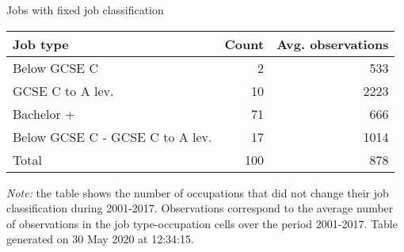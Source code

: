 \begin{center}
\begin{threeparttable}[!h]
\caption{Jobs with fixed job classification}
\begin{tabular}{lrr}
\toprule
\toprule
\textbf{Job type}&\multicolumn{1}{c}{\textbf{Count}}&\multicolumn{1}{c}{\textbf{Avg. observations}} \\
\midrule
\hline
Below GCSE C&2&533 \\
GCSE C to A lev.&10&2223 \\
Bachelor +&71&666 \\
Below GCSE C - GCSE C to A lev.&17&1014 \\
Total&100&878 \\
\bottomrule
\bottomrule
\end{tabular}
\begin{tablenotes}
\item \footnotesize \textit{Note:} the table shows the number of occupations that did not change their job classification during 2001-2017. Observations correspond to the average number of observations in the job type-occupation cells over the period 2001-2017. Table generated on 30 May 2020 at 12:34:15.
\end{tablenotes}
\end{threeparttable}
\end{center}
